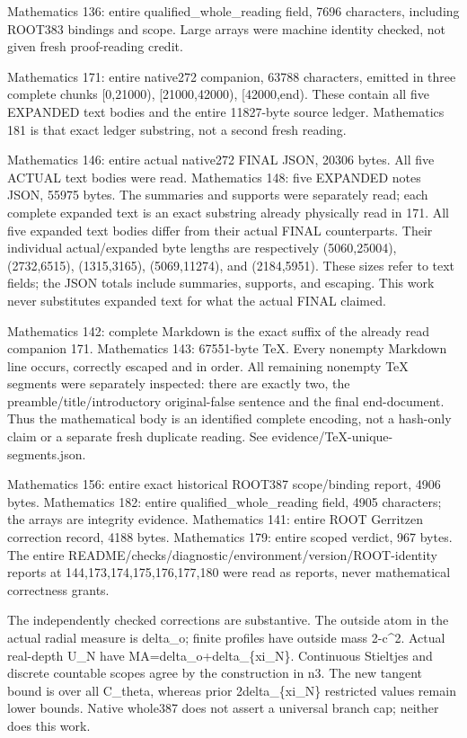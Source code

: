 \documentclass[11pt]{article}
\begin{document}
Mathematics 136: entire qualified\_whole\_reading field, 7696 characters, including ROOT383 bindings and scope. Large arrays were machine identity checked, not given fresh proof-reading credit.

Mathematics 171: entire native272 companion, 63788 characters, emitted in three complete chunks [0,21000), [21000,42000), [42000,end). These contain all five EXPANDED text bodies and the entire 11827-byte source ledger. Mathematics 181 is that exact ledger substring, not a second fresh reading.

Mathematics 146: entire actual native272 FINAL JSON, 20306 bytes. All five ACTUAL text bodies were read. Mathematics 148: five EXPANDED notes JSON, 55975 bytes. The summaries and supports were separately read; each complete expanded text is an exact substring already physically read in 171. All five expanded text bodies differ from their actual FINAL counterparts. Their individual actual/expanded byte lengths are respectively (5060,25004), (2732,6515), (1315,3165), (5069,11274), and (2184,5951). These sizes refer to text fields; the JSON totals include summaries, supports, and escaping. This work never substitutes expanded text for what the actual FINAL claimed.

Mathematics 142: complete Markdown is the exact suffix of the already read companion 171. Mathematics 143: 67551-byte TeX. Every nonempty Markdown line occurs, correctly escaped and in order. All remaining nonempty TeX segments were separately inspected: there are exactly two, the preamble/title/introductory original-false sentence and the final end-document. Thus the mathematical body is an identified complete encoding, not a hash-only claim or a separate fresh duplicate reading. See evidence/TeX-unique-segments.json.

Mathematics 156: entire exact historical ROOT387 scope/binding report, 4906 bytes. Mathematics 182: entire qualified\_whole\_reading field, 4905 characters; the arrays are integrity evidence. Mathematics 141: entire ROOT Gerritzen correction record, 4188 bytes. Mathematics 179: entire scoped verdict, 967 bytes. The entire README/checks/diagnostic/environment/version/ROOT-identity reports at 144,173,174,175,176,177,180 were read as reports, never mathematical correctness grants.

The independently checked corrections are substantive. The outside atom in the actual radial measure is delta\_o; finite profiles have outside mass 2-c\textasciicircum{}2. Actual real-depth U\_N have MA=delta\_o+delta\_\{xi\_N\}. Continuous Stieltjes and discrete countable scopes agree by the construction in n3. The new tangent bound is over all C\_theta, whereas prior 2delta\_\{xi\_N\} restricted values remain lower bounds. Native whole387 does not assert a universal branch cap; neither does this work.
\end{document}
